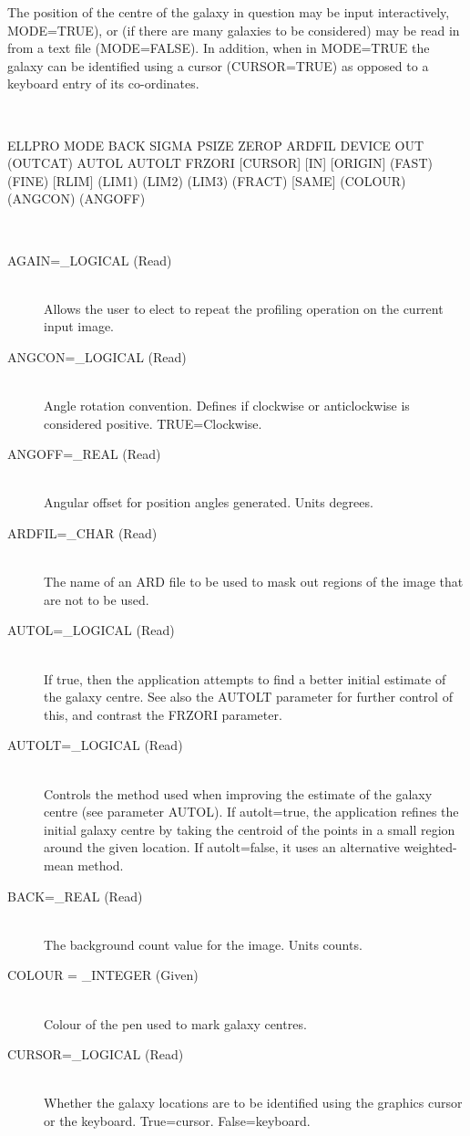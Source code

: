\documentclass[twoside,11pt]{article}
\newcommand{\LineBreak}{\hfill\break\hbox{}\qquad}
\newcommand{\sstusage}[1]{\item[Usage:] \mbox{}
\\[1.3ex]{\raggedright \ssttt #1}}
\newcommand{\sstparameters}[1]{
   \item[Parameters:] \mbox{} \\
   \vspace{-3.5ex}
   \begin{description}
      #1
   \end{description}
}
\newcommand{\sstsubsection}[1]{ \item[{#1}] \mbox{} \\}
\newcommand{\sstusage}[1]{\item[Usage:]
      \begin{description}
         {\ssttt #1}
      \end{description}
      \\
   }
\newcommand{\sstparameters}[1]{
      \item[Parameters:] \\
      \begin{description}
         #1
      \end{description}
      \\
   }
\newcommand{\sstsubsection}[1]{\item[{#1}]}
\begin{document}
{{      The position of the centre of the galaxy in question may be
      input interactively, MODE=TRUE), or (if there are many galaxies
      to be considered) may be read in from a text file (MODE=FALSE).
      In addition, when in MODE=TRUE the galaxy can be identified
      using a cursor (CURSOR=TRUE) as opposed to a keyboard entry of
      its co-ordinates.
   }
   \sstusage{
      ELLPRO MODE BACK SIGMA PSIZE ZEROP ARDFIL DEVICE OUT (OUTCAT)
\LineBreak
             AUTOL AUTOLT FRZORI [CURSOR] [IN] [ORIGIN] (FAST)
\LineBreak
             (FINE) [RLIM] (LIM1) (LIM2) (LIM3) (FRACT) [SAME]
\LineBreak
             [AGAIN] [INFILE) [IMGDEV] (COLOUR) (ANGCON) (ANGOFF)
   }
   \sstparameters{
      \sstsubsection{
         AGAIN=\_LOGICAL (Read)
      }{
         Allows the user to elect to repeat the profiling operation
         on the current input image.
      }
      \sstsubsection{
         ANGCON=\_LOGICAL (Read)
      }{
         Angle rotation convention. Defines if clockwise or
         anticlockwise is considered positive. TRUE=Clockwise.
      }
      \sstsubsection{
         ANGOFF=\_REAL (Read)
      }{
         Angular offset for position angles generated. Units degrees.
      }
      \sstsubsection{
         ARDFIL=\_CHAR (Read)
      }{
         The name of an ARD file to be used to mask out regions of the
         image that are not to be used.
      }
      \sstsubsection{
         AUTOL=\_LOGICAL (Read)
      }{
         If true, then the application attempts to find a better initial
         estimate of the galaxy centre.  See also the AUTOLT parameter
         for further control of this, and contrast the FRZORI parameter.
      }
      \sstsubsection{
         AUTOLT=\_LOGICAL (Read)
      }{
         Controls the method used when improving the estimate of the
         galaxy centre (see parameter AUTOL).  If autolt=true, the
         application refines the initial galaxy centre by taking the
         centroid of the points in a small region around the given
         location.  If autolt=false, it uses an alternative
         weighted-mean method.
      }
      \sstsubsection{
         BACK=\_REAL (Read)
      }{
         The background count value for the image. Units counts.
      }
      \sstsubsection{
         COLOUR = \_INTEGER (Given)
      }{
         Colour of the pen used to mark galaxy centres.
      }
      \sstsubsection{
         CURSOR=\_LOGICAL (Read)
      }{
         Whether the galaxy locations are to be identified using the
         graphics cursor or the keyboard. True=cursor. False=keyboard.
      }
      \sstsubsection{
}}}
\end{document}
